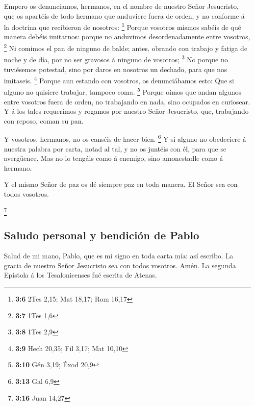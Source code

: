  Empero os denunciamos, hermanos, en el nombre de nuestro
Señor Jesucristo, que os apartéis de todo hermano que anduviere fuera de
orden, y no conforme á la doctrina que recibieron de nosotros:
\footnote{\textbf{3:6} 2Tes 2,15; Mat 18,17; Rom 16,17} 
Porque vosotros mismos sabéis de qué manera debéis imitarnos: porque no
anduvimos desordenadamente entre vosotros, \footnote{\textbf{3:7} 1Tes
  1,6}  Ni comimos el pan de ninguno de balde; antes,
obrando con trabajo y fatiga de noche y de día, por no ser gravosos á
ninguno de vosotros; \footnote{\textbf{3:8} 1Tes 2,9}  No
porque no tuviésemos potestad, sino por daros en nosotros un dechado,
para que nos imitaseis. \footnote{\textbf{3:9} Hech 20,35; Fil 3,17; Mat
  10,10}  Porque aun estando con vosotros, os denunciábamos
esto: Que si alguno no quisiere trabajar, tampoco coma. \footnote{\textbf{3:10}
  Gén 3,19; Éxod 20,9}  Porque oímos que andan algunos
entre vosotros fuera de orden, no trabajando en nada, sino ocupados en
curiosear.  Y á los tales requerimos y rogamos por nuestro
Señor Jesucristo, que, trabajando con reposo, coman su pan.

 Y vosotros, hermanos, no os canséis de hacer bien.
\footnote{\textbf{3:13} Gal 6,9}  Y si alguno no obedeciere
á nuestra palabra por carta, notad al tal, y no os juntéis con él, para
que se avergüence.  Mas no lo tengáis como á enemigo, sino
amonestadle como á hermano.

 Y el mismo Señor de paz os dé siempre paz en toda manera.
El Señor sea con todos vosotros.

\footnote{\textbf{3:16} Juan 14,27}

\hypertarget{saludo-personal-y-bendiciuxf3n-de-pablo}{%
\subsection{Saludo personal y bendición de
Pablo}\label{saludo-personal-y-bendiciuxf3n-de-pablo}}

 Salud de mi mano, Pablo, que es mi signo en toda carta
mía: así escribo.  La gracia de nuestro Señor Jesucristo
sea con todos vosotros. Amén. La segunda Epístola á los Tesalonicenses
fué escrita de Atenas.
